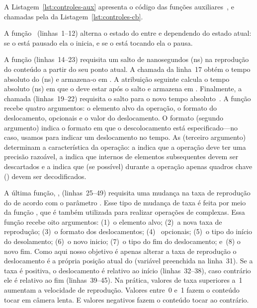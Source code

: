 \documentclass{SBCbookchapter}
\begin{document}


A Listagem~\ref{lst:controles-aux} apresenta o código das funções
auxiliares~,  e~ chamadas pela
  da Listagem~\ref{lst:controles-cb}.

A função~ (linhas~1--12) alterna o estado do 
entre  e  dependendo do estado atual:  se o
 está pausado ela o inicia, e se o  está tocando
ela o pausa.

A função  (linhas~14--23) requisita um salto de 
nanosegundos (ns) na reprodução do conteúdo a partir do seu ponto atual.
A chamada da linha~17 obtém o tempo absoluto do  (ns) e
armazena-o em .  A atribuição seguinte calcula o tempo absoluto (ns)
em que o  deve estar após o salto e armazena em .
Finalmente, a chamada  (linhas~19--22) requisita
o salto para o novo tempo absoluto~.  A função
 recebe quatro argumentos: o elemento alvo da
operação, o formato do deslocamento,  opcionais e o valor do
deslocamento.  O formato (segundo argumento) indica o formato em que o
descolocamento está especificado---no caso, usamos  para
indicar um deslocamento no tempo.  As  (terceiro argumento)
determinam a característica da operação: a 
 indica que a operação deve ter uma precisão
razoável, a   indica que 
internos de elementos subsequentes devem ser descartados e a 
 indica que (se possível) durante a operação apenas
quadros chave () devem ser decodificados.

A última função, , (linhas~25--49) requisita uma mudança na taxa de
reprodução do  de acordo com o parâmetro .  Esse tipo
de mudança de taxa é feita por meio da função , que é
também utilizada para realizar operações de  complexas.  Essa
função recebe oito argumentos: (1)~o elemento alvo; (2)~a nova taxa de
reprodução; (3)~o formato dos deslocamentos; (4)~ opcionais; (5)~o
tipo do início do desolamento; (6)~o novo inicio; (7)~o tipo do fim do
deslocamento; e~(8) o novo fim.  Como aqui nosso objetivo é apenas alterar a
taxa de reprodução o deslocamento é a própria posição atual do 
(variável  preenchida na linha~31).  Se a taxa é positiva, o
deslocamento é relativo ao início (linhas~32--38), caso contrário
ele é relativo ao fim (linhas~39--45).  Na prática, valores de taxa
superiores a~1 aumentam a velocidade de reprodução.  Valores entre~0 e~1
fazem o conteúdo tocar em câmera lenta.  E valores negativos fazem o
conteúdo tocar ao contrário.
\end{document}
